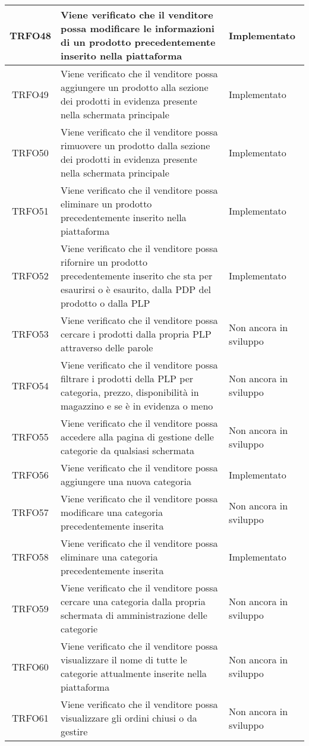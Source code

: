 \begin{longtable}{|c| C{10cm} |C{3cm}|}
    	TRFO48 & Viene verificato che il venditore possa modificare le informazioni di un prodotto precedentemente inserito nella piattaforma & Implementato\\ \hline
    	TRFO49 & Viene verificato che il venditore possa aggiungere un prodotto alla sezione dei prodotti in evidenza presente nella schermata principale & Implementato\\ \hline
    	TRFO50 & Viene verificato che il venditore possa rimuovere un prodotto dalla sezione dei prodotti in evidenza  presente nella schermata principale & Implementato\\ \hline
    	TRFO51 & Viene verificato che il venditore possa eliminare un prodotto precedentemente inserito nella piattaforma & Implementato\\ \hline
    	TRFO52 & Viene verificato che il venditore possa rifornire un prodotto precedentemente inserito che sta per esaurirsi o è esaurito, dalla PDP del prodotto o dalla PLP & Implementato\\ \hline
   	TRFO53 & Viene verificato che il venditore possa cercare i prodotti dalla propria PLP attraverso delle parole & Non ancora in sviluppo\\ \hline
    	TRFO54 & Viene verificato che il venditore possa filtrare i prodotti della PLP per categoria, prezzo, disponibilità in magazzino e se è in evidenza o meno & Non ancora in sviluppo\\ \hline
	TRFO55 & Viene verificato che il venditore possa accedere alla pagina di gestione delle categorie da qualsiasi schermata & Non ancora in sviluppo\\ \hline
    	TRFO56 & Viene verificato che il venditore possa aggiungere una nuova categoria & Implementato\\ \hline
    	TRFO57 & Viene verificato che il venditore possa modificare una categoria precedentemente inserita & Non ancora in sviluppo\\ \hline
   	TRFO58 & Viene verificato che il venditore possa eliminare una categoria precedentemente inserita & Implementato\\ \hline
    	TRFO59 & Viene verificato che il venditore possa cercare una categoria dalla propria schermata di amministrazione delle categorie & Non ancora in sviluppo\\ \hline
	TRFO60 & Viene verificato che il venditore possa visualizzare il nome di tutte le categorie attualmente inserite nella piattaforma & Non ancora in sviluppo\\ \hline
	TRFO61 & Viene verificato che il venditore possa visualizzare gli ordini chiusi o da gestire & Non ancora in sviluppo\\ \hline

\end{longtable}
